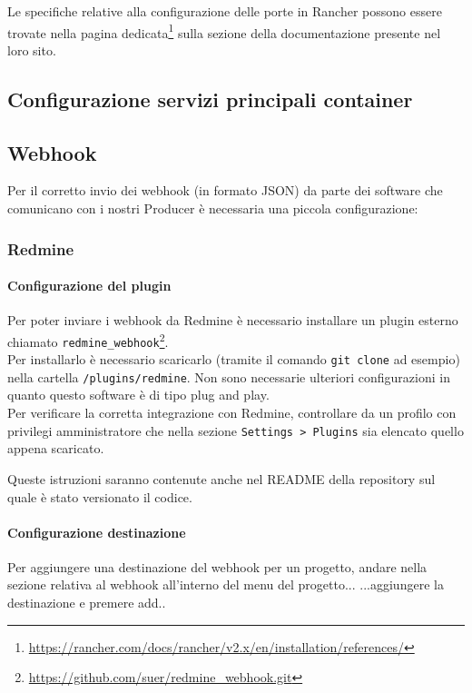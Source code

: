 Le specifiche relative alla configurazione delle porte in Rancher possono essere trovate nella pagina dedicata\footnote{\url{https://rancher.com/docs/rancher/v2.x/en/installation/references/}} sulla sezione della documentazione presente nel loro sito.


\subsection{Configurazione servizi principali container}

	\subsection{Webhook}
	Per il corretto invio dei webhook (in formato JSON) da parte dei software che comunicano con i nostri Producer è necessaria una piccola configurazione:

	\subsubsection{Redmine}

		\paragraph{Configurazione del plugin}

		Per poter inviare i webhook da Redmine è necessario installare un plugin esterno chiamato \texttt{redmine\_webhook}\footnote{\url{https://github.com/suer/redmine_webhook.git}}.\\
		Per installarlo è necessario scaricarlo (tramite il comando \texttt{git clone} ad esempio) nella cartella \texttt{/plugins/redmine}.
		Non sono necessarie ulteriori configurazioni in quanto questo software è di tipo plug and play.\\ %
		Per verificare la corretta integrazione con Redmine, controllare da un profilo con privilegi amministratore che nella sezione \texttt{Settings > Plugins} sia elencato quello appena scaricato.


		Queste istruzioni saranno contenute anche nel README della repository sul quale è stato versionato il codice.

		\paragraph{Configurazione destinazione}
		Per aggiungere una destinazione del webhook per un progetto, andare nella sezione relativa al webhook all'interno del menu del progetto...
		...aggiungere la destinazione e premere add..

